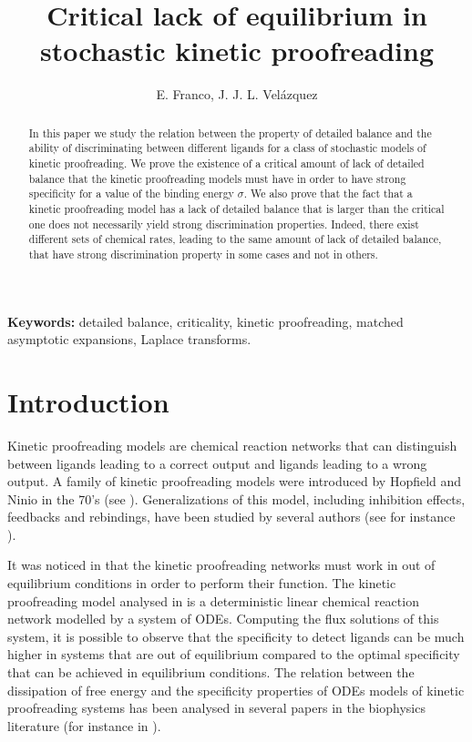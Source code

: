 \documentclass{article}
\title{Critical lack of equilibrium in stochastic kinetic proofreading}
\author{E. Franco, J. J. L. Velázquez}
\numberwithin{equation}{section}
\theoremstyle{plain}
\begin{document}
\maketitle

\begin{abstract}
    In this paper we study the relation between the property of detailed balance and the ability of discriminating between different ligands for a class of stochastic models of kinetic proofreading. 
    We prove the existence of a critical amount of lack of detailed balance that the kinetic proofreading models must have in order to have strong specificity for a value of the binding energy $\sigma$. We also prove that the fact that a kinetic proofreading model has a lack of detailed balance that is larger than the critical one does not necessarily yield strong discrimination properties. 
    Indeed, there exist different sets of chemical rates, leading to the same amount of lack of detailed balance, that have strong discrimination property in some cases and not in others. 
\end{abstract}

\textbf{Keywords:} detailed balance, criticality, kinetic proofreading, matched asymptotic expansions, Laplace transforms. 
\tableofcontents

\section{Introduction}
Kinetic proofreading models are chemical reaction networks that can distinguish between ligands leading to a correct output and ligands leading to a wrong output.
A family of kinetic proofreading models were introduced by Hopfield and Ninio in the 70's (see \cite{hopfield1974kinetic,Ninio}). Generalizations of this model, including inhibition effects,  feedbacks and rebindings, have been studied by several authors (see for instance \cite{chan2004feedback,dushek2009role,franccois2016case,franccois2013phenotypic,govern2010fast,rendall2017multiple,sontag2001structure}).

It was noticed in \cite{hopfield1974kinetic} that the kinetic proofreading networks must work in out of equilibrium conditions in order to perform their function. The kinetic proofreading model analysed in \cite{hopfield1974kinetic} is a deterministic linear chemical reaction network modelled by a system of ODEs. Computing the flux solutions of this system, it is possible to observe that the specificity to detect ligands can be much higher in systems that are out of equilibrium compared to the optimal specificity that can be achieved in equilibrium conditions. 
The relation between the dissipation of free energy and the specificity properties of ODEs models of kinetic proofreading systems has been analysed in several papers in the biophysics literature (for instance in \cite{bennett1979dissipation,pineros2020kinetic,wegscheider1902simultane,yu2022energy}).
\end{document}
